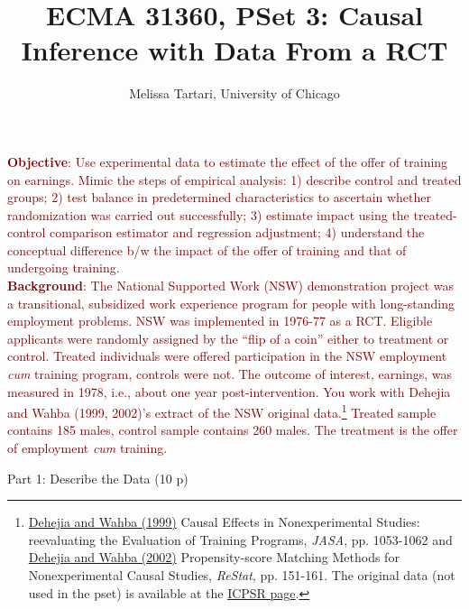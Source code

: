 \documentclass{article}
\newcommand{\psetnum}{3}
\begin{document}
\title{ECMA 31360, PSet \psetnum: Causal Inference with Data From a RCT}
\date{}
\author{Melissa Tartari, University of Chicago}
\maketitle
\thispagestyle{fancy}

\noindent \textcolor{Maroon}{\textbf{Objective}: Use experimental data to estimate the effect of the offer of training on earnings. Mimic the steps of empirical analysis: 1) describe control and treated groups; 2) test balance in predetermined characteristics to ascertain whether randomization was carried out successfully; 3) estimate impact using the treated-control comparison estimator and regression adjustment; 4) understand the conceptual difference b/w the impact of the offer of training and that of undergoing training.}\\

\noindent \textcolor{Maroon}{\textbf{Background}: The National Supported Work (NSW) demonstration project was a transitional, subsidized work experience program for people with long-standing employment problems. NSW was implemented in 1976-77 as a RCT. Eligible applicants were randomly assigned by the ``flip of a coin'' either to treatment or control. Treated individuals were offered participation in the NSW employment \textit{cum} training program, controls were not. The outcome of interest, earnings, was measured in 1978, i.e., about one year post-intervention. You work with Dehejia and Wahba (1999, 2002)'s extract of the NSW original data.\footnote{\href{https://www.jstor.org/stable/2669919}{Dehejia and Wahba (1999)} Causal Effects in Nonexperimental Studies: reevaluating the Evaluation of Training Programs, \textit{JASA}, pp. 1053-1062 and \href{https://users.nber.org/~rdehejia/papers/matching.pdf}{Dehejia and Wahba (2002)} Propensity-score Matching Methods for Nonexperimental Causal Studies, \textit{ReStat}, pp. 151-161. The original data (not used in the pset) is available at the \href{http://www.icpsr.umich.edu/icpsrweb/ICPSR/studies/7865}{ICPSR page}.} Treated sample contains 185 males, control sample contains 260 males. The treatment is the offer of employment \textit{cum} training.}  


\begin{center}
{\LARGE Part 1: Describe the Data (10 p)}
\end{center}
\end{document}
